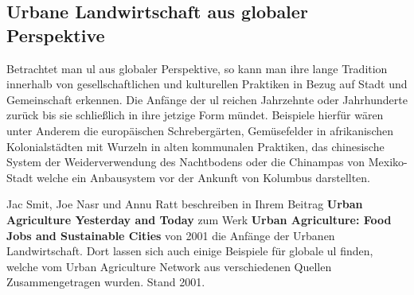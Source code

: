 \documentclass{scrartcl}
\begin{document}
\subsection{Urbane Landwirtschaft aus globaler Perspektive}

Betrachtet man \acs{ul} aus globaler Perspektive, so kann man ihre lange Tradition innerhalb von gesellschaftlichen und kulturellen Praktiken in Bezug auf Stadt und Gemeinschaft erkennen. Die Anfänge der \acs{ul} reichen Jahrzehnte oder Jahrhunderte zurück bis sie schließlich in ihre jetzige Form mündet. Beispiele hierfür wären unter Anderem die europäischen Schrebergärten, Gemüsefelder in afrikanischen Kolonialstädten mit Wurzeln in alten kommunalen Praktiken, das chinesische System der Weiderverwendung des Nachtbodens oder die Chinampas von Mexiko-Stadt welche ein Anbausystem vor der Ankunft von Kolumbus darstellten.

Jac Smit, Joe Nasr und Annu Ratt beschreiben in Ihrem Beitrag \textbf{Urban Agriculture Yesterday and Today} zum Werk \textbf{Urban Agriculture: Food Jobs and Sustainable Cities} von 2001 die Anfänge der Urbanen Landwirtschaft. Dort lassen sich auch einige Beispiele für globale \acs{ul} finden, welche vom Urban Agriculture Network aus verschiedenen Quellen Zusammengetragen wurden. Stand 2001.
\end{document}
